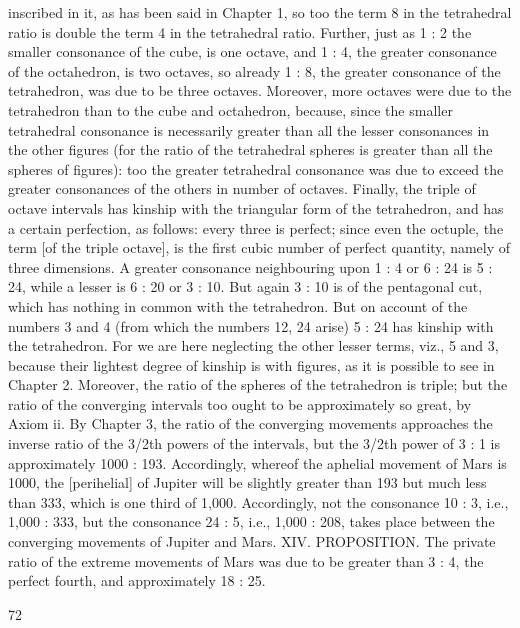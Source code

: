 \documentclass{article}
\begin{document}
inscribed in it, as has been said in Chapter 1, so too the term 8 in the
tetrahedral ratio is double the term 4 in the tetrahedral ratio.
Further, just as 1 : 2 the smaller consonance of the cube, is one octave,
and 1 : 4, the greater consonance of the octahedron, is two octaves, so
already 1 : 8, the greater consonance of the tetrahedron, was due to be
three octaves. Moreover, more octaves were due to the tetrahedron than
to the cube and octahedron, because, since the smaller tetrahedral
consonance is necessarily greater than all the lesser consonances in the
other figures (for the ratio of the tetrahedral spheres is greater than all
the spheres of figures): too the greater tetrahedral consonance was due
to exceed the greater consonances of the others in number of octaves.
Finally, the triple of octave intervals has kinship with the triangular form
of the tetrahedron, and has a certain perfection, as follows: every three is
perfect; since even the octuple, the term [of the triple octave], is the first
cubic number of perfect quantity, namely of three dimensions.
A greater consonance neighbouring upon 1 : 4 or 6 : 24 is 5 : 24, while a
lesser is 6 : 20 or 3 : 10. But again 3 : 10 is of the pentagonal cut, which
has nothing in common with the tetrahedron. But on account of the
numbers 3 and 4 (from which the numbers 12, 24 arise) 5 : 24 has
kinship with the tetrahedron. For we are here neglecting the other lesser
terms, viz., 5 and 3, because their lightest degree of kinship is with
figures, as it is possible to see in Chapter 2. Moreover, the ratio of the
spheres of the tetrahedron is triple; but the ratio of the converging
intervals too ought to be approximately so great, by Axiom ii. By Chapter
3, the ratio of the converging movements approaches the inverse ratio of
the 3/2th powers of the intervals, but the 3/2th power of 3 : 1 is
approximately 1000 : 193. Accordingly, whereof the aphelial movement
of Mars is 1000, the [perihelial] of Jupiter will be slightly greater than
193 but much less than 333, which is one third of 1,000. Accordingly, not
the consonance 10 : 3, i.e., 1,000 : 333, but the consonance 24 : 5, i.e.,
1,000 : 208, takes place between the converging movements of Jupiter
and Mars.
XIV. PROPOSITION. The private ratio of the extreme movements of
Mars was due to be greater than 3 : 4, the perfect fourth, and
approximately 18 : 25.


72
\end{document}
